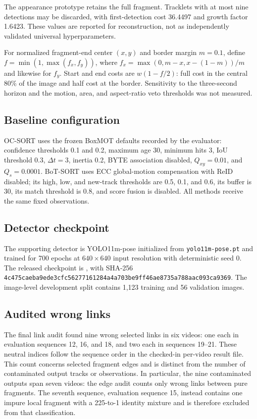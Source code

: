 The appearance prototype retains the full fragment.  Tracklets with at most nine
detections may be discarded, with first-detection cost 36.4497 and growth factor
1.6423.  These values are reported for reconstruction, not as independently
validated universal hyperparameters.

For normalized fragment-end center $(x,y)$ and border margin $m=0.1$, define
$f=\min(1,\max(f_x,f_y))$, where
$f_x=\max(0,m-x,x-(1-m))/m$ and likewise for $f_y$.  Start and end costs are
$w(1-f/2)$: full cost in the central 80\% of the image and half cost at the border.
Sensitivity to the three-second horizon and the motion, area, and aspect-ratio veto
thresholds was not measured.

\subsection{Baseline configuration}

OC-SORT uses the frozen BoxMOT defaults recorded by the evaluator: confidence
thresholds 0.1 and 0.2, maximum age 30, minimum hits 3, IoU threshold 0.3,
$\Delta t=3$, inertia 0.2, BYTE association disabled, $Q_{xy}=0.01$, and
$Q_s=0.0001$.  BoT-SORT uses ECC global-motion compensation with ReID disabled;
its high, low, and new-track thresholds are 0.5, 0.1, and 0.6, its buffer is 30,
its match threshold is 0.8, and score fusion is disabled.  All methods receive the
same fixed observations.

\subsection{Detector checkpoint}

The supporting detector is YOLO11m-pose initialized from
\texttt{yolo11m-pose.pt} and trained for 700 epochs at $640\times640$ input
resolution with deterministic seed 0.  The released checkpoint is
,
with SHA-256
\nolinkurl{4c475caeba9ede3cfc56277161284a4a703be9ff46ae8735a788aac093ca9369}.
The image-level development split
contains 1,123 training and 56 validation images.

\subsection{Audited wrong links}

The final link audit found nine wrong selected links in six videos: one each in
evaluation sequences 12, 16, and 18, and two each in sequences 19--21.  These neutral
indices follow the sequence order in the checked-in per-video result file.  This count concerns selected fragment edges and
is distinct from the number of contaminated output tracks or observations.  In
particular, the nine contaminated outputs span seven videos: the edge audit counts
only wrong links between pure fragments.  The seventh sequence, evaluation sequence 15,
instead contains one impure local fragment with a 225-to-1 identity mixture and is
therefore excluded from that classification.
